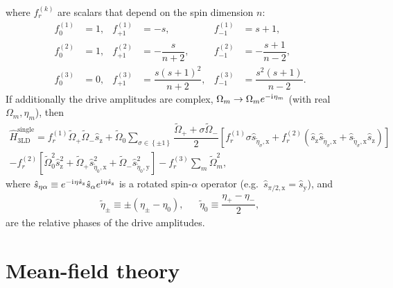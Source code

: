 \documentclass[aps,pra,nofootinbib,twocolumn,superscriptaddress]{revtex4-2}
\renewcommand{\t}{\text} %
\newcommand{\f}[2]{\dfrac{#1}{#2}} %
\newcommand{\p}[1]{\left(#1\right)} %
\renewcommand{\sp}[1]{\left[#1\right]} %
\renewcommand{\set}[1]{\left\{#1\right\}} %
\renewcommand{\i}{\mathrm{i}\mkern1mu} %
\newcommand{\1}{\mathds{1}}
\newcommand{\s}{\hat s}
\renewcommand{\H}{\hat H}
\newcommand{\x}{\text{x}}
\newcommand{\y}{\text{y}}
\newcommand{\z}{\text{z}}
\begin{document}
where $f_r^{(k)}$ are scalars that depend on the spin dimension $n$:
\begin{align}
  f_0^{(1)} &= 1, &
  f_{+1}^{(1)} &= -s, &
  f_{-1}^{(1)} &= s+1, \\
  f_0^{(2)} &= 1, &
  f_{+1}^{(2)} &= -\f{s}{n+2}, &
  f_{-1}^{(2)} &= -\f{s+1}{n-2}, \\
  f_0^{(3)} &= 0, &
  f_{+1}^{(3)} &= \f{s(s+1)^2}{n+2}, &
  f_{-1}^{(3)} &= \f{s^2(s+1)}{n-2}.
\end{align}
If additionally the drive amplitudes are complex, $\Omega_m\to\Omega_me^{-\i\eta_m}$ (with real $\Omega_m,\eta_m$), then
\begin{multline}
  \H_{\t{3LD}}^{\t{single}}
  = f_r^{(1)} \tilde\Omega_+ \tilde\Omega_- \s_\z
  + \tilde\Omega_0 \sum_{\sigma\in\set{\pm1}}
  \f{\tilde\Omega_+ + \sigma\tilde\Omega_-}{2}
  \sp{f_r^{(1)} \sigma \s_{\tilde\eta_\sigma,\x}
    + f_r^{(2)} \p{\s_\z \s_{\tilde\eta_\sigma,\x}
      + \s_{\tilde\eta_\sigma,\x} \s_\z}} \\
  - f_r^{(2)} \sp{\tilde\Omega_0^2 \s_\z^2
    + \tilde\Omega_+ \s_{\tilde\eta_0,\x}^2
    + \tilde\Omega_- \s_{\tilde\eta_0,\y}^2}
  - f_r^{(3)} \sum_m \tilde\Omega_m^2,
\end{multline}
where $\s_{\eta\alpha} \equiv e^{-\i\eta \s_\z} \s_\alpha e^{\i\eta \s_\z}$ is a rotated spin-$\alpha$ operator (e.g.~$\s_{\pi/2,\x}=\s_\y$), and
\begin{align}
  \tilde\eta_\pm \equiv \pm \p{\eta_\pm - \eta_0},
  &&
  \tilde\eta_0 \equiv \f{\eta_+ - \eta_-}{2},
\end{align}
are the relative phases of the drive amplitudes.

\section{Mean-field theory}
\label{sec:MFT}
\end{document}
